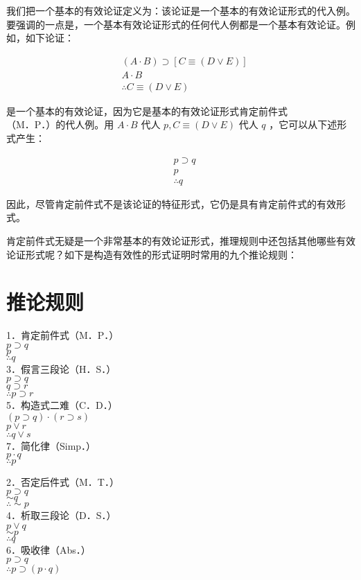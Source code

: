 我们把一个基本的有效论证定义为：该论证是一个基本的有效论证形式的代入例。要强调的一点是，一个基本有效论证形式的任何代人例都是一个基本有效论证。例如，如下论证：

$$
\begin{aligned}
& (A \cdot B) \supset[C \equiv(D \vee E)] \\
& A \cdot B \\
& \therefore C \equiv(D \vee E)
\end{aligned}
$$

是一个基本的有效论证，因为它是基本的有效论证形式肯定前件式\\
（M．P．）的代人例。用 $A \cdot B$ 代人 $p, C \equiv(D \vee E)$ 代人 $q$ ，它可以从下述形式产生：

$$
\begin{aligned}
& p \supset q \\
& p \\
& \therefore q
\end{aligned}
$$

因此，尽管肯定前件式不是该论证的特征形式，它仍是具有肯定前件式的有效形式。

肯定前件式无疑是一个非常基本的有效论证形式，推理规则中还包括其他哪些有效论证形式呢？如下是构造有效性的形式证明时常用的九个推论规则：

\section*{推论规则}
1．肯定前件式（M．P．）\\
$p \supset q$\\
$p$\\
$\therefore q$\\
3．假言三段论（H．S．）\\
$p \supset q$\\
$q \supset r$\\
$\therefore p \supset r$\\
5．构造式二难（C．D．）\\
$(p \supset q) \cdot(r \supset s)$\\
$p \vee r$\\
$\therefore q \vee s$\\
7．简化律（Simp．）\\
$p \cdot q$\\
$\therefore p$

2．否定后件式（M．T．）\\
$p \supset q$\\
$\sim q$\\
$\therefore \sim p$\\
4．析取三段论（D．S．）\\
$p \vee q$\\
$\sim p$\\
$\therefore q$\\
6．吸收律（Abs．）\\
$p \supset q$\\
$\therefore p \supset(p \cdot q)$

